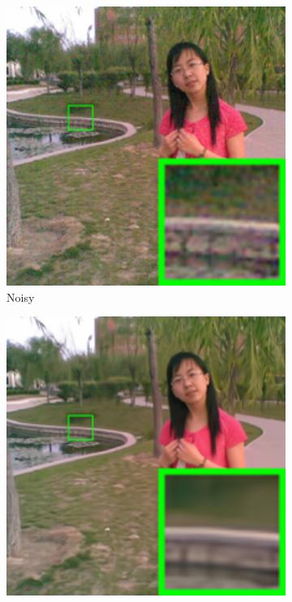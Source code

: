 \begin{figure}
    \centering
    \begin{subfigure}[t]{0.19\textwidth}
        \centering
        \includegraphics[width=1\textwidth]{images/mcwnnm/nc/resize_br_Noisy_chinesegirl.png}
		\caption{Noisy}
    \end{subfigure}
    \hfill
    \begin{subfigure}[t]{0.19\textwidth}
        \centering
        \includegraphics[width=1\textwidth]{images/mcwnnm/nc/resize_br_CBM3D_chinesegirl.png}

\end{subfigure}
\end{figure}
